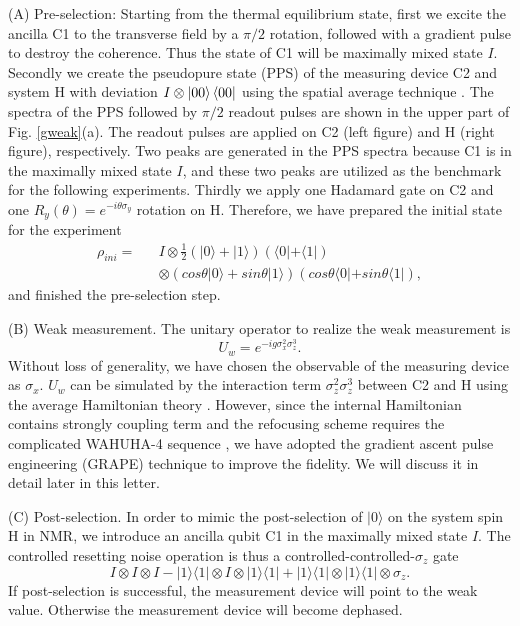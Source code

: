 \documentclass[aps,pra,12pt,onecolumn,showpacs,superscriptaddress,floatfix,footinbib,subfigure]{revtex4}
\def\bra#1{\mathinner{\langle{#1}|}}
\def\ket#1{\mathinner{|{#1}\rangle}}
\def\kb#1{\ket{#1}\bra{#1}}
\begin{document}
 (A) Pre-selection:  Starting from the thermal equilibrium state, first we excite the ancilla C1 to the transverse field by a $\pi/2$ rotation, followed with a gradient pulse to destroy the coherence. Thus the state of C1 will be maximally mixed state $I$. Secondly we create the pseudopure state (PPS) of the measuring device C2 and system H with deviation $I \otimes \kb{00}$ using the spatial average technique \cite{spatial}. The spectra of the PPS followed by $\pi/2$ readout pulses are shown in the upper part of Fig. \ref{gweak}(a). The readout pulses are applied on C2 (left figure) and H (right figure), respectively. Two peaks are generated in the PPS spectra because C1 is in the maximally mixed state $I$, and these two peaks are utilized as the benchmark for the following experiments. Thirdly we apply one Hadamard gate on C2 and one $R_y(\theta) = e^{-i\theta\sigma_y}$ rotation on H. Therefore, we have prepared the initial state for the experiment
 \begin{eqnarray}\label{pps}
 \rho_{ini}= &&I\otimes \frac{1}{2} (|0\rangle + |1\rangle) (\langle 0 | + \langle 1 |) \nonumber\\
 &&\otimes  (cos\theta|0\rangle + sin\theta|1\rangle)(cos\theta\langle 0 | + sin\theta\langle 1 |),
 \end{eqnarray}
 and finished the pre-selection step.

 (B) Weak measurement. The unitary operator to realize the weak measurement is
 \begin{equation}\label{uw}
U_w=e^{-ig\sigma_x^2 \sigma_z^3}.
 \end{equation}
 Without loss of generality, we have chosen the observable of the measuring device as $\sigma_x$. $U_w$ can be simulated by the interaction term $\sigma_z^2\sigma_z^3$ between C2 and H using the average Hamiltonian theory \cite{ernstbook}. However, since the internal Hamiltonian contains strongly coupling term and the refocusing scheme requires the complicated WAHUHA-4 sequence \cite{wahuha}, we have adopted the gradient ascent pulse engineering (GRAPE) technique \cite{grape1,grape2} to improve the fidelity. We will discuss it in detail later in this letter.

 (C) Post-selection. In order to mimic the post-selection of $|0\rangle$ on the system spin H in NMR, we introduce an ancilla qubit C1 in the maximally mixed state $I$. The controlled resetting noise operation is thus a controlled-controlled-$\sigma_z$ gate
 \begin{equation}\label{postselection}
I\otimes I \otimes I - |1\rangle \langle 1 | \otimes I \otimes  |1\rangle \langle 1 | + |1\rangle \langle 1 | \otimes |1\rangle \langle 1 | \otimes \sigma_z.
 \end{equation}
 If post-selection is successful, the measurement device will point to the weak value. Otherwise the measurement device will become dephased.
\end{document}
